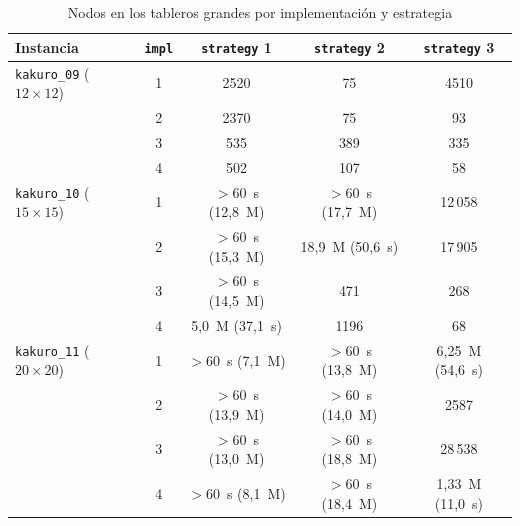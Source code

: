 \begin{table}[htbp]
    \caption{Nodos en los tableros grandes por implementación y estrategia}
    \label{tab:kakuro-grandes}
    \begin{tabular}{@{}lcccc@{}}
        \toprule
        Instancia                                & \texttt{impl} & \texttt{strategy} 1          & \texttt{strategy} 2          & \texttt{strategy} 3          \\
        \midrule
        \texttt{kakuro\_09} ($12 \times 12$)    & 1             & 2520                         & 75                           & 4510                         \\
                                                 & 2             & 2370                         & 75                           & 93                           \\
                                                 & 3             & 535                          & 389                          & 335                          \\
                                                 & 4             & 502                          & 107                          & 58                           \\
        \addlinespace
        \texttt{kakuro\_10} ($15 \times 15$)    & 1             & $>60$~s (12,8~M)             & $>60$~s (17,7~M)             & 12\,058                      \\
                                                 & 2             & $>60$~s (15,3~M)             & 18,9~M (50,6~s)              & 17\,905                      \\
                                                 & 3             & $>60$~s (14,5~M)             & 471                          & 268                          \\
                                                 & 4             & 5,0~M (37,1~s)               & 1196                         & 68                           \\
        \addlinespace
        \texttt{kakuro\_11} ($20 \times 20$)    & 1             & $>60$~s (7,1~M)              & $>60$~s (13,8~M)             & 6,25~M (54,6~s)              \\
                                                 & 2             & $>60$~s (13,9~M)             & $>60$~s (14,0~M)             & 2587                         \\
                                                 & 3             & $>60$~s (13,0~M)             & $>60$~s (18,8~M)             & 28\,538                      \\
                                                 & 4             & $>60$~s (8,1~M)              & $>60$~s (18,4~M)             & 1,33~M (11,0~s)              \\
        \bottomrule
    \end{tabular}
\end{table}

